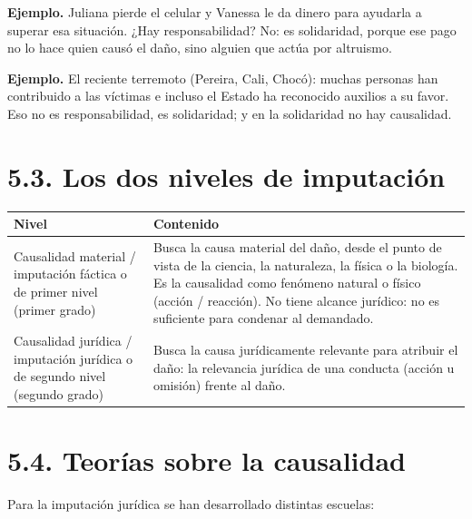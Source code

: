 \begin{ejemplo}
\textcolor[HTML]{4F6228}{\textbf{Ejemplo. }}Juliana pierde el celular y Vanessa le da dinero para ayudarla a superar esa situación. ¿Hay responsabilidad? No: es solidaridad, porque ese pago no lo hace quien causó el daño, sino alguien que actúa por altruismo.
\par
\textcolor[HTML]{4F6228}{\textbf{Ejemplo. }}El reciente terremoto (Pereira, Cali, Chocó): muchas personas han contribuido a las víctimas e incluso el Estado ha reconocido auxilios a su favor. Eso no es responsabilidad, es solidaridad; y en la solidaridad no hay causalidad.
\end{ejemplo}
\section{5.3. Los dos niveles de imputación}
\begin{tabla}
\begin{longtable}{|>{\raggedright\arraybackslash}m{}|>{\raggedright\arraybackslash}m{}|}
\hline
\cellcolor[HTML]{1F3864}\textcolor[HTML]{FFFFFF}{\textbf{Nivel}} & \cellcolor[HTML]{1F3864}\textcolor[HTML]{FFFFFF}{\textbf{Contenido}} \\ \hline
Causalidad material / imputación fáctica o de primer nivel (primer grado) & Busca la causa material del daño, desde el punto de vista de la ciencia, la naturaleza, la física o la biología. Es la causalidad como fenómeno natural o físico (acción / reacción). No tiene alcance jurídico: no es suficiente para condenar al demandado. \\ \hline
\cellcolor[HTML]{F2F5FA}Causalidad jurídica / imputación jurídica o de segundo nivel (segundo grado) & \cellcolor[HTML]{F2F5FA}Busca la causa jurídicamente relevante para atribuir el daño: la relevancia jurídica de una conducta (acción u omisión) frente al daño. \\ \hline
\end{longtable}
\end{tabla}
\section{5.4. Teorías sobre la causalidad}
Para la imputación jurídica se han desarrollado distintas escuelas:

